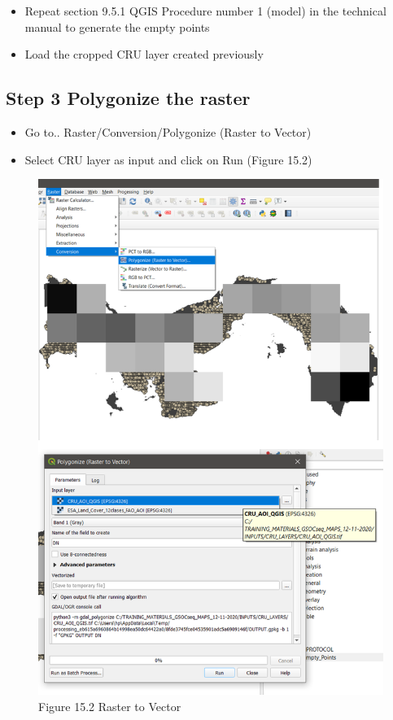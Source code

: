 \documentclass[
  10pt,
  b5paper,
]{book}
\providecommand{\tightlist}{%
  \setlength{\itemsep}{0pt}\setlength{\parskip}{0pt}}
\begin{document}
\begin{itemize}
\tightlist
\item
  Repeat section 9.5.1 QGIS Procedure number 1 (model) in the technical manual to generate the empty points
\item
  Load the cropped CRU layer created previously
\end{itemize}

\hypertarget{step-3-polygonize-the-raster}{%
\subsection*{Step 3 Polygonize the raster}\label{step-3-polygonize-the-raster}}

\begin{itemize}
\tightlist
\item
  Go to.. Raster/Conversion/Polygonize (Raster to Vector)
\item
  Select CRU layer as input and click on Run (Figure 15.2)
\end{itemize}

\begin{figure}
\centering
\includegraphics{images/Figure_11.png}
\caption{Figure 15.2 Raster to Vector}
\end{figure}
\end{document}
